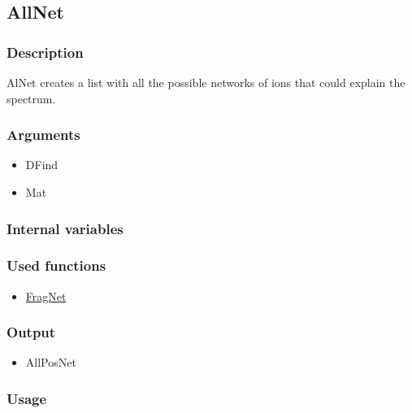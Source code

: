 \subsection{AllNet}\label{AllNet}
\subsubsection{Description}
AlNet creates a list with all the possible networks of ions that could explain the spectrum.
\subsubsection{Arguments}
\begin{itemize}
\item DFind
\item Mat
\end{itemize}
\subsubsection{Internal variables}
\subsubsection{Used functions}
\begin{itemize}
\item \hyperref[FragNet]{FragNet}
\end{itemize}
\subsubsection{Output}
\begin{itemize}
\item AllPosNet
\end{itemize}
\subsubsection{Usage}





